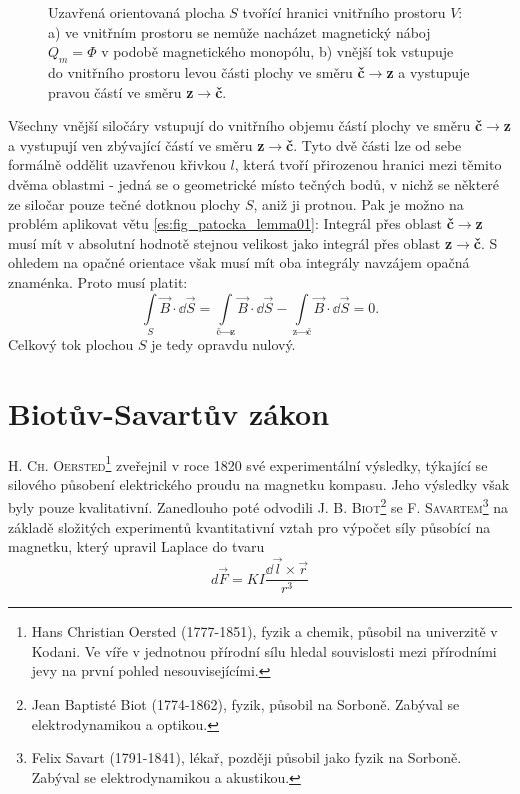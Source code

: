     \begin{figure}[ht!]
      \centering  
      \caption{Uzavřená orientovaná plocha \(S\) tvořící hranici vnitřního prostoru \(V\): a) ve
               vnitřním prostoru se nemůže nacházet magnetický náboj \(Q_m = \Phi\) v podobě
               magnetického monopólu, b) vnější tok vstupuje do vnitřního prostoru levou části
               plochy ve směru \textbf{č\(\rightarrow\)z} a vystupuje pravou částí ve směru 
               \textbf{z\(\rightarrow\)č}.} 
      \label{teo:fig061}
    \end{figure}

    Všechny vnější siločáry vstupují do vnitřního objemu částí plochy ve směru
    \textbf{č}\(\rightarrow\)\textbf{z} a vystupují ven zbývající částí ve směru
    \textbf{z}\(\rightarrow\)\textbf{č}. Tyto dvě části lze od sebe formálně oddělit uzavřenou
    křivkou \(l\), která tvoří přirozenou hranici mezi těmito dvěma oblastmi - jedná se o
    geometrické místo tečných bodů, v nichž se některé ze siločar pouze tečné dotknou plochy \(S\),
    aniž ji protnou. Pak je možno na problém aplikovat větu \ref{es:fig_patocka_lemma01}: Integrál
    přes oblast \textbf{č}\(\rightarrow\)\textbf{z} musí mít v absolutní hodnotě stejnou velikost
    jako integrál přes oblast \textbf{z}\(\rightarrow\)\textbf{č}. S ohledem na opačné orientace
    však musí mít oba integrály navzájem opačná znaménka. Proto musí platit:
    \begin{equation*}
      \int\limits_{S}\vec{B}\cdot \dd{\vec{S}} = 
      \int\limits_{\text{č}\rightarrow\text{z}}\vec{B}\cdot \dd{\vec{S}} -
      \int\limits_{\text{z}\rightarrow\text{č}}\vec{B}\cdot \dd{\vec{S}} = 0.
    \end{equation*} 
    Celkový tok plochou \(S\) je tedy opravdu nulový.
    
  \section{Biotův-Savartův zákon}\label{ES:sec10} \textsc{H. Ch. Oersted}\footnote{Hans Christian
    Oersted (1777-1851), fyzik a chemik, působil na univerzitě v Kodani. Ve víře v jednotnou
    přírodní sílu hledal souvislosti mezi přírodními jevy na první pohled nesouvisejícími.}
    zveřejnil v roce 1820 své experimentální výsledky, týkající se silového působení elektrického
    proudu na magnetku kompasu. Jeho výsledky však byly pouze kvalitativní. Zanedlouho poté odvodili
    \textsc{J. B. Biot}\footnote{Jean Baptisté Biot (1774-1862), fyzik, působil na Sorboně. Zabýval
    se elektrodynamikou a optikou.} se \textsc{F. Savartem}\footnote{Felix Savart (1791-1841),
    lékař, později působil jako fyzik na Sorboně. Zabýval se elektrodynamikou a akustikou.} na
    základě složitých experimentů kvantitativní vztah pro výpočet síly působící na magnetku, který
    upravil Laplace do tvaru
    \begin{equation}\label{TEO:eq133}
      d\vec{F} = KI\frac{\dd{\vec{l}}\times \vec{r}}{r^3}
    \end{equation} 
    
